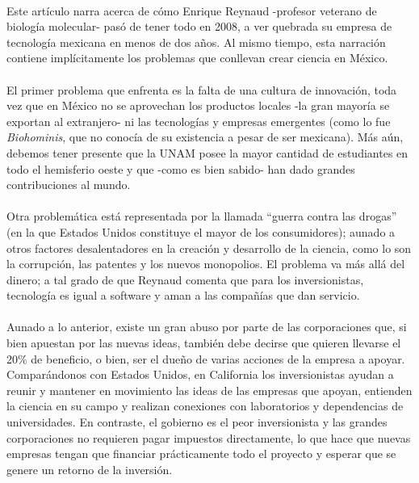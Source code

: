\documentclass[letterpaper,12pt]{article} %
\begin{document}
    \\
	Este artículo narra acerca de cómo Enrique Reynaud -profesor veterano de biología molecular- pasó de tener todo en 2008, a ver quebrada su empresa de tecnología mexicana en menos de dos años. Al mismo tiempo, esta narración contiene implícitamente los problemas que conllevan crear ciencia en México. \\ \\
	El primer problema que enfrenta es la falta de una cultura de innovación, toda vez que en México no se aprovechan los productos locales -la gran mayoría se exportan al extranjero- ni las tecnologías y empresas emergentes (como lo fue \emph{Biohominis}, que no conocía de su existencia a pesar de ser mexicana). Más aún, debemos tener presente que la UNAM posee la mayor cantidad de estudiantes en todo el hemisferio oeste y que -como es bien sabido- han dado grandes contribuciones al mundo. \\ \\
	Otra problemática está representada por la llamada “guerra contra las drogas” (en la que Estados Unidos constituye el mayor de los consumidores); aunado a otros factores desalentadores en la creación y desarrollo de la ciencia, como lo son la corrupción, las patentes y los nuevos monopolios. El problema va más allá del dinero; a tal grado de que Reynaud comenta que para los inversionistas, tecnología es igual a software y aman a las compañías que dan servicio. \\ \\
	Aunado a lo anterior, existe un gran abuso por parte de las corporaciones que, si bien apuestan por las nuevas ideas, también debe decirse que quieren llevarse el 20\% de beneficio, o bien, ser el dueño de varias acciones de la empresa a apoyar. Comparándonos con Estados Unidos, en California los inversionistas ayudan a reunir y mantener en movimiento las ideas de las empresas que apoyan, entienden la ciencia en su campo y realizan conexiones con laboratorios y dependencias de universidades. En contraste, el gobierno es el peor inversionista y las grandes corporaciones no requieren pagar impuestos directamente, lo que hace que nuevas empresas tengan que financiar prácticamente todo el proyecto y esperar que se genere un retorno de la inversión.
\end{document}
